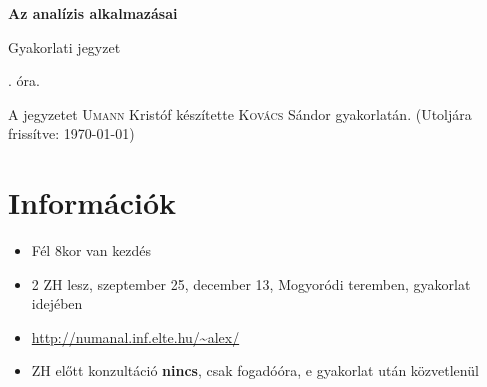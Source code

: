 \documentclass[a4paper,11.5pt]{article}
\begin{document}
	\setlength\parindent{0pt}
	\def\a{\textbf{a}}
	\def\b{\textbf{b}}
	\def\N{\hskip 10 true mm}
	\def\a{\textbf{a}}
	\def\b{\textbf{b}}
	\def\c{\textbf{c}}
	\def\d{\textbf{d}}
	\def\e{\textbf{e}}
	\def\gg{$\gamma$}
	\def\vi{\textbf{i}}
	\def\jj{\textbf{j}}
	\def\kk{\textbf{k}}
	\def\fh{\overrightarrow}
	\def\l{\lambda}
	\def\m{\mu}
	\def\v{\textbf{v}}
	\def\0{\textbf{0}}
	\def\s{\hspace{0.2mm}\vphantom{\beta}}
	\def\Z{\mathbb{Z}}
	\def\Q{\mathbb{Q}}
	\def\R{\mathbb{R}}
	\def\C{\mathbb{C}}
	\def\N{\mathbb{N}}
	\def\Rn{\mathbb{R}^{n}}
	\def\Ra{\overline{\mathbb{R}}}
	\def\sume{\displaystyle\sum_{n=1}^{+\infty}}
	\def\sumn{\displaystyle\sum_{n=0}^{+\infty}}
	\def\biz{\emph{Bizonyítás:\ }}
	\def\narrow{\underset{n\rightarrow+\infty}{\longrightarrow}}
	\def\limn{\displaystyle\lim_{n\to +\infty}}
	
	\theoremstyle{definition}
	\newtheorem{theorem}{Tétel}[subsubsection]
	
	\theoremstyle{definition}
	\newtheorem{definition}[theorem]{Definíció}
	\newtheorem{example}[theorem]{Példa}
	\newtheorem{exercise}[theorem]{Házi feladat}
	\newtheorem{note}[theorem]{Megjegyzés}
	\newtheorem{task}[theorem]{Feladat}
	\newtheorem{revision}[theorem]{Emlékeztető}
	\begin{center}
		{\LARGE\textbf{Az analízis alkalmazásai}}
		\smallskip

		{\Large Gyakorlati jegyzet}

		. óra.
	\end{center}
	A jegyzetet \textsc{Umann} Kristóf készítette \textsc{Kovács} Sándor gyakorlatán. (Utoljára frissítve: \today)
	\section{Információk}
	\begin{itemize}
		\item Fél 8kor van kezdés
		\item 2 ZH lesz, szeptember 25, december 13, Mogyoródi teremben, gyakorlat idejében
		\item \url{http://numanal.inf.elte.hu/~alex/}
		\item ZH előtt konzultáció \textbf{nincs}, csak fogadóóra, e gyakorlat után közvetlenül
	\end{itemize}
\end{document}
